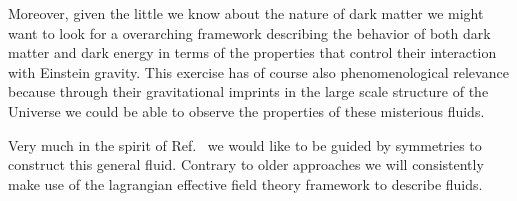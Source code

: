\documentclass[a4paper,11pt]{article}
\begin{document}
Moreover, given the little we know about the nature of dark matter we might want to look for a overarching framework describing the behavior of both dark matter and dark energy in terms of the properties that control their interaction with Einstein gravity. This exercise has of course also phenomenological relevance because through their gravitational imprints in the large scale structure of the Universe we could be able to observe the properties of these misterious fluids.  

Very much in the spirit of Ref.~\cite{Hu:1998kj} we would like to be guided by symmetries to construct this general fluid. Contrary to older approaches we will consistently make use of the lagrangian effective field theory framework to describe fluids. 








\newpage
\appendix 

\newpage


\newpage


\newpage


\newpage


\newpage











\end{document}
